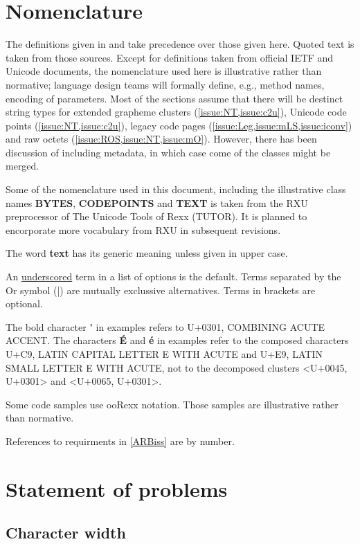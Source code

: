 \documentclass[b4paper]{article}
\begin{document}
\section{Nomenclature}

The definitions given in \cite{USTD:Gloss} and \cite{Unicode} take
precedence over those given here. Quoted text is taken from those sources.
Except for definitions taken from official IETF and Unicode documents,
the nomenclature used here is illustrative rather than normative;
language design teams will formally define, e.g., method names, encoding of parameters.
Most of the sections assume that there will be destinct string types
for extended grapheme clusters (\cref{issue:NT,issue:c2u}), Unicode code points (\cref{issue:NT,issue:c2u}),
legacy code pages (\cref{issue:Leg,issue:mLS,issue:iconv})
and raw octets (\cref{issue:ROS,issue:NT,issue:mO}). However, there has been discussion of including
metadata, in which case come of the classes might be merged.

Some of the nomenclature used in this document, including
the illustrative class names \textbf{BYTES}, \textbf{CODEPOINTS} and \textbf{TEXT}
is taken from the RXU preprocessor of The Unicode Tools of Rexx (TUTOR).
It is planned to encorporate more vocabulary from RXU in subsequent revisions.

The word \textbf{text} has its generic meaning unless given in upper case.

An \underline{underscored} term in a list of options is the default.
Terms separated by the Or symbol (|) are mutually exclussive alternatives.
Terms in brackets are optional.

The bold character \textbf{\'{ }} in examples refers to
U+0301, COMBINING ACUTE ACCENT.
The characters \textbf{\'{E}} and \textbf{\'{e}} in examples refer to the
composed characters U+C9, LATIN CAPITAL LETTER E WITH ACUTE and
U+E9, LATIN SMALL LETTER E WITH ACUTE, not to the decomposed clusters
<U+0045, U+0301> and <U+0065, U+0301>.

Some code samples use ooRexx notation. Those samples are illustrative rather than normative.

References to requirments in \cref{ARBiss}  are by number.


\section{Statement of problems}

\subsection{Character width}
\end{document}
